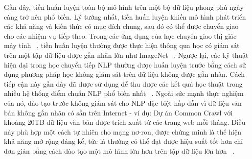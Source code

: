 \documentclass[conference]{IEEEtran}
\begin{document}
Gần đây, tiền huấn luyện toàn bộ mô hình trên một bộ dữ liệu phong phú ngày càng trở nên phổ biến. Lý tưởng nhất, tiến huấn luyện khiến mô hình phát triển các khả năng và kiến thức có mục đích chung, sau đó có thể được chuyển giao cho các nhiệm vụ tiếp theo. Trong các ứng dụng của học chuyển giao thị giác máy tính ~\cite{oquab2014learning, thrun2004advances, minyoung2016ImageNet}, tiền huấn luyện thường được thực hiện thông qua học có giám sát trên một tập dữ liệu được gắn nhãn lớn như ImageNet ~\cite{Deng2009ImageNet, Russakovsky2015ImageNet}. Ngược lại, các kỹ thuật hiện đại trong học chuyển tiếp NLP thường được huấn luyện trước bằng cách sử dụng phương pháp học không giám sát trên dữ liệu không được gắn nhãn. Cách tiếp cận này gần đây đã được sử dụng để thu được các kết quả học thuật trong nhiều hệ thống điểm chuẩn NLP phổ biến nhất ~\cite{kentonbert, dong2019unified, liu2019roberta}. Ngoài sức mạnh thực nghiệm của nó, đào tạo trước không giám sát cho NLP đặc biệt hấp dẫn vì dữ liệu văn bản không gắn nhãn có sẵn trên Internet - ví dụ: Dự án Common Crawl với khoảng 20TB dữ liệu văn bản được trích xuất từ các trang web mỗi tháng. Điều này phù hợp một cách tự nhiên cho mạng nơ-ron, được chứng minh là thể hiện khả năng mở rộng đáng kể, tức là thường có thể đạt được hiệu suất tốt hơn chỉ đơn giản bằng cách đào tạo một mô hình lớn hơn trên tập dữ liệu lớn hơn ~\cite{hestnessdeep, shazeer2017outrageously, jozefowicz2016exploring, mahajan2018exploring, radford2019language}.



\end{document}
